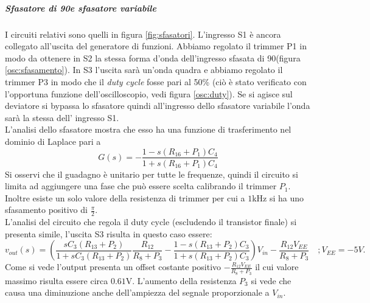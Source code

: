 \documentclass[10pt,a4paper]{article}
\begin{document}
\subparagraph{Sfasatore di 90\degree e sfasatore variabile}
I circuiti relativi sono quelli in figura \ref{fig:sfasatori}. L'ingresso S1 è ancora collegato all'uscita del generatore di funzioni. Abbiamo regolato il trimmer P1 in modo da ottenere in S2 la stessa forma d'onda dell'ingresso sfasata di 90\degree (figura \ref{osc:sfasamento}). In S3 l'uscita sarà un'onda quadra e abbiamo regolato il trimmer P3 in modo che il \emph{duty cycle} fosse pari al 50\% (ciò è stato verificato con l'opportuna funzione dell'oscilloscopio, vedi figura \ref{osc:duty}). Se si agisce sul deviatore si bypassa lo sfasatore quindi all'ingresso dello sfasatore variabile l'onda sarà la stessa dell' ingresso S1.\\
L'analisi dello sfasatore mostra che esso ha una funzione di trasferimento nel dominio di Laplace pari a
\begin{equation}
 G(s) = -\frac{1-s(R_{16} +P_1) C_{4}}{1+s(R_{16} + P_1)C_{4}}
\end{equation}
Si osservi che il guadagno è unitario per tutte le frequenze, quindi il circuito si limita ad aggiungere una fase che può essere scelta calibrando il trimmer $P_1$. Inoltre esiste un solo valore della resistenza di trimmer per cui a $1$kHz si ha uno sfasamento positivo di $\frac{\pi}{2}$.\\
L'analisi del circuito che regola il duty cycle (escludendo il transistor finale) si presenta simile, l'uscita S3 risulta in questo caso essere:
\begin{equation}
v_{out}(s) = \left( \frac{s C_3 (R_{13} + P_2)}{1 + s C_3 (R_{13} + P_2)} \frac{R_{12}}{R_8+P_3} -\frac{1-s(R_{13} +P_2) C_{3}}{1+s(R_{13} + P_2)C_{3}} \right) V_{in}-\frac{R_{12} V_{EE}}{R_8+P_3}
\, \, \, \, \, \, ; V_{EE} = -5V.
\end{equation}
Come si vede l'output presenta un offset costante positivo $-\frac{R_{12} V_{EE}}{R_8+P_3}$ il cui valore massimo risulta essere circa $0.61$V. L'aumento della resistenza $P_3$ si vede che causa una diminuzione anche dell'ampiezza del segnale proporzionale a $V_{in}$. 

\end{document}
